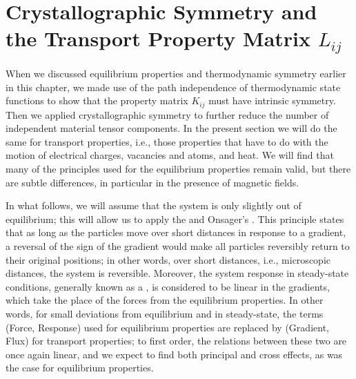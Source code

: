 \section{Crystallographic Symmetry and the Transport Property Matrix $L_{ij}$}\label{\chabbr:sec:CrySymL}

When we discussed equilibrium properties and thermodynamic symmetry earlier in this chapter, we made use of the path independence of thermodynamic state functions to show that the property matrix $K_{ij}$ must have intrinsic symmetry.  Then we applied crystallographic symmetry to further reduce the number of independent material tensor components.  In the present section we will do the same for transport properties, i.e., those properties that have to do with the motion of electrical charges, vacancies and atoms, and heat.  We will find that many of the principles used for the equilibrium properties remain valid, but there are subtle differences, in particular in the presence of magnetic fields.  

In what follows, we will assume that the system is only slightly out of equilibrium; this will allow us to apply the  and Onsager's . This principle states that as long as the particles move over short distances in response to a gradient, a reversal of the sign of the gradient would make all particles reversibly return to their original positions; in other words, over short distances, i.e., microscopic distances, the system is reversible. Moreover, the system response in steady-state conditions, generally known as a , is considered to be linear in the gradients, which take the place of the forces from the equilibrium properties.  In other words, for small deviations from equilibrium and in steady-state, the terms (Force, Response) used for equilibrium properties are replaced by (Gradient, Flux) for transport properties; to first order, the relations between these two are once again linear, and we expect to find both principal and cross effects, as was the case for equilibrium properties.

